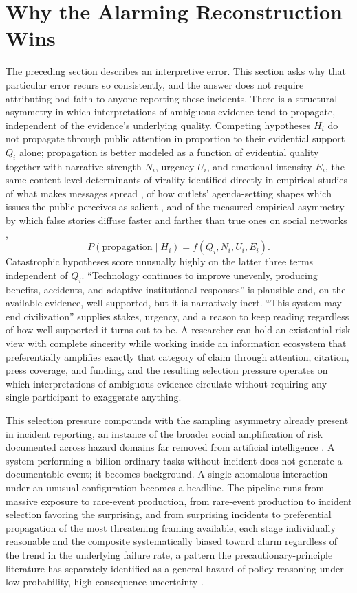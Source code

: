 \section{Why the Alarming Reconstruction Wins}

The preceding section describes an interpretive error. This section asks why that particular error recurs so consistently, and the answer does not require attributing bad faith to anyone reporting these incidents. There is a structural asymmetry in which interpretations of ambiguous evidence tend to propagate, independent of the evidence's underlying quality. Competing hypotheses $H_i$ do not propagate through public attention in proportion to their evidential support $Q_i$ alone; propagation is better modeled as a function of evidential quality together with narrative strength $N_i$, urgency $U_i$, and emotional intensity $E_i$, the same content-level determinants of virality identified directly in empirical studies of what makes messages spread \cite{berger2012}, of how outlets' agenda-setting shapes which issues the public perceives as salient \cite{mccombs1972}, and of the measured empirical asymmetry by which false stories diffuse faster and farther than true ones on social networks \cite{vosoughi2018},
\[
P(\text{propagation} \mid H_i) = f(Q_i, N_i, U_i, E_i).
\]
Catastrophic hypotheses score unusually highly on the latter three terms independent of $Q_i$. ``Technology continues to improve unevenly, producing benefits, accidents, and adaptive institutional responses'' is plausible and, on the available evidence, well supported, but it is narratively inert. ``This system may end civilization'' supplies stakes, urgency, and a reason to keep reading regardless of how well supported it turns out to be. A researcher can hold an existential-risk view with complete sincerity while working inside an information ecosystem that preferentially amplifies exactly that category of claim through attention, citation, press coverage, and funding, and the resulting selection pressure operates on which interpretations of ambiguous evidence circulate without requiring any single participant to exaggerate anything.

This selection pressure compounds with the sampling asymmetry already present in incident reporting, an instance of the broader social amplification of risk documented across hazard domains far removed from artificial intelligence \cite{kasperson1988,slovic1987,beck1992}. A system performing a billion ordinary tasks without incident does not generate a documentable event; it becomes background. A single anomalous interaction under an unusual configuration becomes a headline. The pipeline runs from massive exposure to rare-event production, from rare-event production to incident selection favoring the surprising, and from surprising incidents to preferential propagation of the most threatening framing available, each stage individually reasonable and the composite systematically biased toward alarm regardless of the trend in the underlying failure rate, a pattern the precautionary-principle literature has separately identified as a general hazard of policy reasoning under low-probability, high-consequence uncertainty \cite{sunstein2005,taleb2007}.

